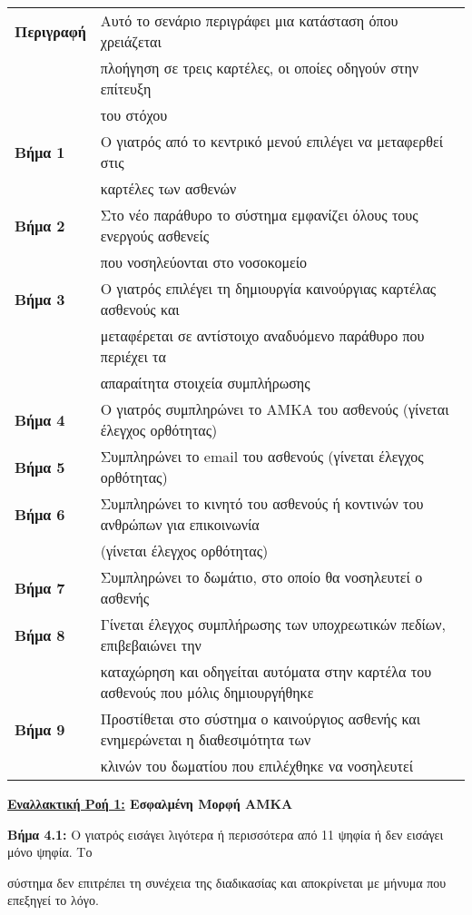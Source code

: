 \documentclass{article}
\newcommand\T{\rule{0pt}{2.6ex}}       %
\newcommand\B{\rule[-1.2ex]{0pt}{0pt}}
\begin{document}
  \begin{center}
     \begin{tabular}{|l|l|}
     \hline
      \textbf{Περιγραφή} & Αυτό το σενάριο περιγράφει μια κατάσταση όπου χρειάζεται \T \\& πλοήγηση σε τρεις καρτέλες, οι οποίες οδηγούν στην επίτευξη \\& του στόχου \B \\ 
      \hline
      \textbf{Βήμα 1} & Ο γιατρός από το κεντρικό μενού επιλέγει να μεταφερθεί στις \T \\& καρτέλες των ασθενών \B \\
      \hline
      \textbf{Βήμα 2} & Στο νέο παράθυρο το σύστημα εμφανίζει όλους τους ενεργούς ασθενείς\T \\& που νοσηλεύονται στο νοσοκομείο \B\\
      \hline
      \textbf{Βήμα 3} & Ο γιατρός επιλέγει τη δημιουργία καινούργιας καρτέλας ασθενούς και \T \\& μεταφέρεται σε αντίστοιχο αναδυόμενο παράθυρο που περιέχει τα \\& απαραίτητα στοιχεία συμπλήρωσης \B \\
      \hline
      \textbf{Βήμα 4} & Ο γιατρός συμπληρώνει το ΑΜΚΑ του ασθενούς (γίνεται έλεγχος ορθότητας) \T\B \\
      \hline
      \textbf{Βήμα 5} & Συμπληρώνει το email του ασθενούς (γίνεται έλεγχος ορθότητας) \T\B \\
      \hline
      \textbf{Βήμα 6} & Συμπληρώνει το κινητό του ασθενούς ή κοντινών του ανθρώπων για επικοινωνία \T \\& (γίνεται έλεγχος ορθότητας) \B \\
      \hline
      \textbf{Βήμα 7} & Συμπληρώνει το δωμάτιο, στο οποίο θα νοσηλευτεί ο ασθενής \T\B \\
      \hline
      \textbf{Βήμα 8} & Γίνεται έλεγχος συμπλήρωσης των υποχρεωτικών πεδίων, επιβεβαιώνει την \T \\& καταχώρηση και οδηγείται αυτόματα στην καρτέλα του ασθενούς που μόλις δημιουργήθηκε \B \\
      \hline
      \textbf{Βήμα 9} & Προστίθεται στο σύστημα ο καινούργιος ασθενής και ενημερώνεται η διαθεσιμότητα των \T \\& κλινών του δωματίου που επιλέχθηκε να νοσηλευτεί \B \\
      \hline
     \end{tabular}
 \end{center}
 
\textbf{\underline{Εναλλακτική Ροή 1:} Εσφαλμένη Μορφή ΑΜΚΑ} \vspace{0.2cm}
\par \textbf{Βήμα 4.1:} Ο γιατρός εισάγει λιγότερα ή περισσότερα από 11 ψηφία ή δεν εισάγει μόνο ψηφία. Το \par σύστημα δεν επιτρέπει τη συνέχεια της διαδικασίας και αποκρίνεται με μήνυμα που επεξηγεί το λόγο.  \vspace{0.2cm}
\end{document}
